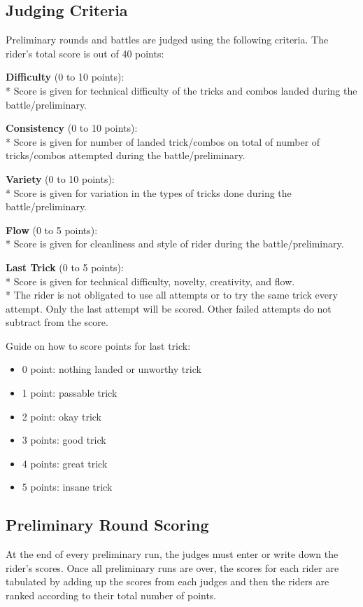 \subsection{Judging Criteria}

Preliminary rounds and battles are judged using the following criteria.
The rider's total score is out of 40 points:

\textbf{Difficulty} (0 to 10 points): \\*
Score is given for technical difficulty of the tricks and combos landed during the battle/preliminary.

\textbf{Consistency} (0 to 10 points): \\*
Score is given for number of landed trick/combos on total of number of tricks/combos attempted during the battle/preliminary.

\textbf{Variety} (0 to 10 points): \\*
Score is given for variation in the types of tricks done during the battle/preliminary.

\textbf{Flow} (0 to 5 points): \\*
Score is given for cleanliness and style of rider during the battle/preliminary.

\textbf{Last Trick} (0 to 5 points): \\*
Score is given for technical difficulty, novelty, creativity, and flow. \\*
The rider is not obligated to use all attempts or to try the same trick every attempt.
Only the last attempt will be scored.
Other failed attempts do not subtract from the score.

Guide on how to score points for last trick:
\begin{itemize}
\item 0 point: nothing landed or unworthy trick
\item 1 point: passable trick
\item 2 point: okay trick
\item 3 points: good trick
\item 4 points: great trick
\item 5 points: insane trick
\end{itemize}

\subsection{Preliminary Round Scoring}
At the end of every preliminary run, the judges must enter or write down the rider's scores.
Once all preliminary runs are over, the scores for each rider are tabulated by adding up the scores from each judges and then the riders are ranked according to their total number of points.

